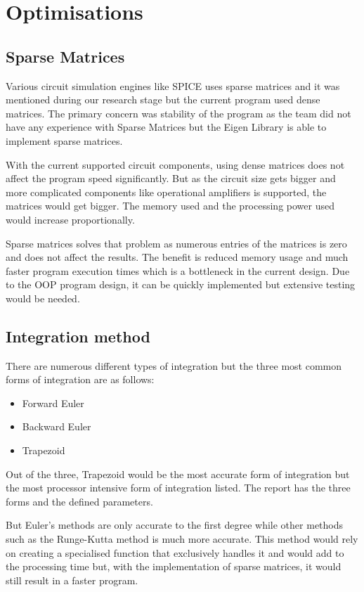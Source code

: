 \documentclass[12pt,a4paper]{article}
\begin{document}
\section{Optimisations}
\subsection{Sparse Matrices}
Various circuit simulation engines like SPICE uses sparse matrices and it was mentioned \cite{OOP} during our research stage but 
the current program used dense matrices. The primary concern was stability of the program as the team did not have 
any experience with Sparse Matrices but the Eigen Library is able to implement sparse matrices. \par
With the current supported circuit components, using dense matrices does not affect the program speed significantly. But as 
the circuit size gets bigger and more complicated components like operational amplifiers is supported, the matrices would
get bigger. The memory used and the processing power used would increase proportionally. \par
Sparse matrices solves that problem as numerous entries of the matrices is zero and does not affect the results. The benefit is
reduced memory usage and much faster program execution times which is a bottleneck in the current design.
Due to the OOP program design, it can be quickly implemented but extensive testing would be needed.
\subsection{Integration method}
There are numerous different types of integration but the three most common forms of integration are as follows:
\begin{itemize}
	\item Forward Euler
	\item Backward Euler
	\item Trapezoid
\end{itemize}
Out of the three, Trapezoid would be the most accurate form of integration but the most processor intensive form of integration listed.
The report has the three forms and the defined parameters. \par
But Euler's methods are only accurate to the first degree while other methods such as the Runge-Kutta method is much more accurate.
This method would rely on creating a specialised function that exclusively handles it and would add to the processing time but,
with the implementation of sparse matrices, it would still result in a faster program.
\end{document}
